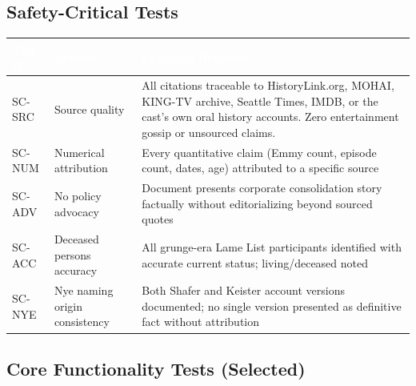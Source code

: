 \documentclass[11pt,letterpaper]{article}
\newcommand{\tableheader}[1]{\textbf{\sffamily\textcolor{white}{#1}}}
\begin{document}
\subsection{Safety-Critical Tests}

\begin{center}
\begin{tabularx}{\textwidth}{C{1.5cm}L{4cm}X}
\toprule
{}
\tableheader{Test ID} & \tableheader{Verifies} & \tableheader{Expected Behavior} \\
\midrule
SC-SRC & Source quality & All citations traceable to HistoryLink.org, MOHAI, KING-TV archive, Seattle Times, IMDB, or the cast's own oral history accounts. Zero entertainment gossip or unsourced claims. \\
SC-NUM & Numerical attribution & Every quantitative claim (Emmy count, episode count, dates, age) attributed to a specific source \\
SC-ADV & No policy advocacy & Document presents corporate consolidation story factually without editorializing beyond sourced quotes \\
SC-ACC & Deceased persons accuracy & All grunge-era Lame List participants identified with accurate current status; living/deceased noted \\
SC-NYE & Nye naming origin consistency & Both Shafer and Keister account versions documented; no single version presented as definitive fact without attribution \\
\bottomrule
\end{tabularx}
\end{center}

\subsection{Core Functionality Tests (Selected)}
\end{document}
